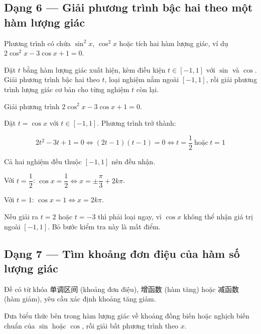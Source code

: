 \documentclass[11pt, a4paper]{article}
\begin{document}
\subsection{Dạng 6 — Giải phương trình bậc hai theo một hàm lượng giác}

 Phương trình có chứa $\sin^2 x$, $\cos^2 x$ hoặc tích hai hàm lượng giác, ví dụ $2\cos^2 x - 3\cos x + 1 = 0$.

 Đặt $t$ bằng hàm lượng giác xuất hiện, kèm điều kiện $t \in [-1, 1]$ với $\sin$ và $\cos$. Giải phương trình bậc hai theo $t$, loại nghiệm nằm ngoài $[-1, 1]$, rồi giải phương trình lượng giác cơ bản cho từng nghiệm $t$ còn lại.

\begin{vidu}[{6}]
Giải phương trình $2\cos^2 x - 3\cos x + 1 = 0$.

Đặt $t = \cos x$ với $t \in [-1, 1]$. Phương trình trở thành:

$$2t^2 - 3t + 1 = 0 \iff (2t - 1)(t - 1) = 0 \iff t = \frac{1}{2} \ \text{hoặc} \ t = 1$$

Cả hai nghiệm đều thuộc $[-1, 1]$ nên đều nhận.

Với $t = \dfrac{1}{2}$: $\cos x = \dfrac{1}{2} \iff x = \pm\dfrac{\pi}{3} + 2k\pi$.

Với $t = 1$: $\cos x = 1 \iff x = 2k\pi$.

 Nếu giải ra $t = 2$ hoặc $t = -3$ thì phải loại ngay, vì $\cos x$ không thể nhận giá trị ngoài $[-1, 1]$. Bỏ bước kiểm tra này là mất điểm.

\end{vidu}
\subsection{Dạng 7 — Tìm khoảng đơn điệu của hàm số lượng giác}

 Đề có từ khóa 单调区间 (khoảng đơn điệu), 增函数 (hàm tăng) hoặc 减函数 (hàm giảm), yêu cầu xác định khoảng tăng giảm.

 Đưa biểu thức bên trong hàm lượng giác về khoảng đồng biến hoặc nghịch biến chuẩn của $\sin$ hoặc $\cos$, rồi giải bất phương trình theo $x$.
\end{document}
